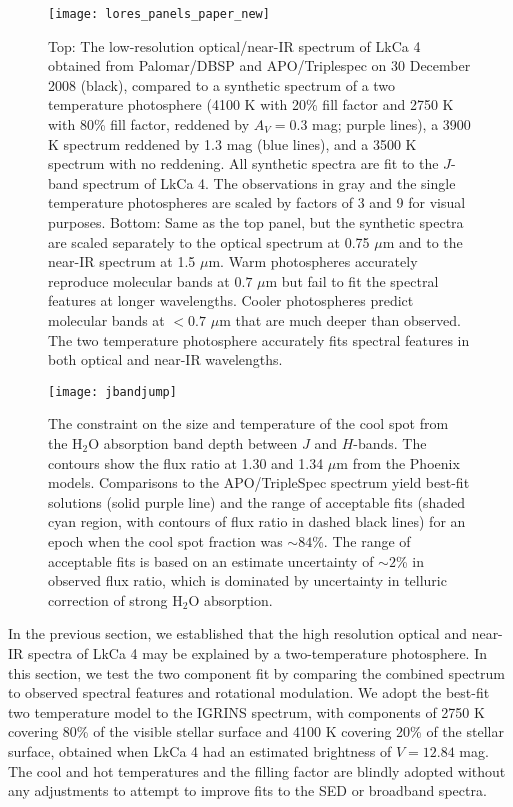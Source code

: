 \documentclass[twocolumn]{emulateapj}%
\begin{document}
\begin{figure*}
 \centering
 \texttt{[image: lores\_panels\_paper\_new]}
 \caption{Top:  The low-resolution optical/near-IR spectrum of LkCa 4 obtained from Palomar/DBSP and APO/Triplespec on 30 December 2008 (black), compared to a synthetic spectrum of a two temperature photosphere (4100 K with 20\% fill factor and 2750 K with 80\% fill factor, reddened by $A_V=0.3$ mag; purple lines), a 3900 K spectrum reddened by 1.3 mag (blue lines), and a 3500 K spectrum with no reddening.  All synthetic spectra are fit to the $J$-band spectrum of LkCa 4. The observations in gray and the single temperature photospheres are scaled by factors of 3 and 9 for visual purposes.
 Bottom:  Same as the top panel, but the synthetic spectra are 
scaled separately to the optical spectrum at 0.75 $\mu$m and to the near-IR spectrum at 1.5 $\mu$m.  Warm photospheres accurately reproduce molecular bands at $0.7$ $\mu$m but fail to fit the spectral features at longer wavelengths.  Cooler photospheres predict molecular bands at $<0.7$ $\mu$m that are much deeper than observed.  The two temperature photosphere accurately fits spectral features in both optical and near-IR wavelengths.}
 \label{fig:lores}
\end{figure*}


\begin{figure}
 \centering
\texttt{[image: jbandjump]}
\caption{The constraint on the size and temperature of the cool spot from the H$_2$O absorption band depth between $J$ and $H$-bands.  The contours show the flux ratio at 1.30 and 1.34 $\mu$m from the Phoenix models.  Comparisons to the APO/TripleSpec spectrum yield best-fit solutions (solid purple line) and the range of acceptable fits (shaded cyan region, with contours of flux ratio in dashed black lines) for an epoch when  the cool spot fraction was $\sim 84$\%.  The range of acceptable fits is based on an estimate uncertainty of $\sim 2$\% in observed flux ratio, which is dominated by uncertainty in telluric correction of strong H$_2$O absorption. }
 \label{fig:h2ojump}
\end{figure}


In the previous section, we established that the high resolution optical and near-IR spectra of LkCa 4 may be explained by a two-temperature photosphere.  In this section, we test the two component fit by comparing the combined spectrum to observed spectral features and rotational modulation.  We adopt the best-fit two temperature model to the IGRINS spectrum, with components of 2750 K covering 80\% of the visible stellar surface and 4100 K covering 20\% of the stellar surface, obtained when LkCa 4 had an estimated brightness of $V=12.84$ mag.  The cool and hot temperatures and the filling factor are blindly adopted without any adjustments to attempt to improve fits to the SED or broadband spectra.
\end{document}
